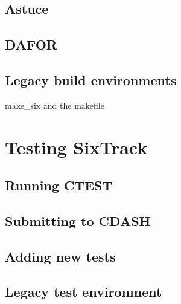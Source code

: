 \documentclass[english]{article}
\begin{document}
\subsection{Astuce}

\subsection{DAFOR}

\subsection{Legacy build environments}
make\_six and the makefile

\section{Testing SixTrack}

\subsection{Running CTEST}

\subsection{Submitting to CDASH}

\subsection{Adding new tests}

\subsection{Legacy test environment}
\end{document}
